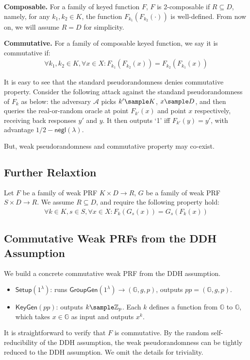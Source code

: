 \begin{trivlist}
\item \textbf{Composable.} For a family of keyed function $F$, $F$ is 2-composable if $R \subseteq D$, 
    namely, for any $k_1, k_2 \in K$, the function $F_{k_1}(F_{k_2}(\cdot))$ is well-defined. 
    From now on, we will assume $R = D$ for simplicity.   

\item \textbf{Commutative.} For a family of composable keyed function, we say it is commutative if:  
\begin{gather*}
    \forall k_1, k_2 \in K, \forall x \in X: F_{k_1}(F_{k_2}(x)) = F_{k_2}(F_{k_1}(x))
\end{gather*}
\end{trivlist}

It is easy to see that the standard pseudorandomness denies commutative property. 
Consider the following attack against the standand pseudorandomness of $F_k$ as below: 
the adversary $\mathcal{A}$ picks $k' \sample K$, $x \sample D$, 
and then queries the real-or-random oracle at point $F_{k'}(x)$ and point $x$ respectively, 
receiving back responses $y'$ and $y$. It then outputs `1' iff $F_{k'}(y) = y'$, with advantage $1/2 - \mathsf{negl}(\lambda)$.
  
But, weak pseudorandomness and commutative property may co-exist. 

\subsection{Further Relaxtion}
Let $F$ be a family of weak PRF $K \times D \rightarrow R$, $G$ be a family of weak PRF $S \times D \rightarrow R$. 
We assume $R \subseteq D$, and require the following property hold:
\begin{gather*}
\forall k \in K, s \in S, \forall x \in X: F_k(G_s(x)) = G_s(F_k(x)) 
\end{gather*} 

\subsection{Commutative Weak PRFs from the DDH Assumption}
We build a concrete commutative weak PRF from the DDH assumption. 
\begin{itemize}
\item $\mathsf{Setup}(1^\lambda)$: runs $\mathsf{GroupGen}(1^\lambda) \rightarrow (\mathbb{G}, g, p)$, 
    outputs $pp = (\mathbb{G}, g, p)$. 

\item $\mathsf{KeyGen}(pp)$: outputs $k \sample \mathbb{Z}_p$. 
    Each $k$ defines a function from $\mathbb{G}$ to $\mathbb{G}$, 
    which takes $x \in \mathbb{G}$ as input and outputs $x^k$. 
\end{itemize}
It is straightforward to verify that $F$ is commutative. 
By the random self-reducibility of the DDH assumption, 
the weak pseudorandomness can be tightly reduced to the DDH assumption. 
We omit the details for triviality. 

